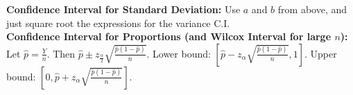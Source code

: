 \documentclass[10pt, twocolumn]{article}
\begin{document}
\textbf{Confidence Interval for Standard Deviation:} Use $a$ and $b$ from above, and just square root the expressions for the variance C.I.\\
\textbf{Confidence Interval for Proportions (and Wilcox Interval for large $n$):} Let $\hat{p} = \frac{Y}{n}$. Then $\hat{p} \pm z_{\frac{\alpha}{2}} \sqrt{\frac{\hat{p}(1-\hat{p})}{n}}$. Lower bound: $\left[ \hat{p} - z_{\alpha} \sqrt{\frac{\hat{p}(1-\hat{p})}{n}}, 1 \right]$. Upper bound: $\left[ 0, \hat{p} + z_{\alpha} \sqrt{\frac{\hat{p}(1-\hat{p})}{n}} \right]$.\\


\end{document}
